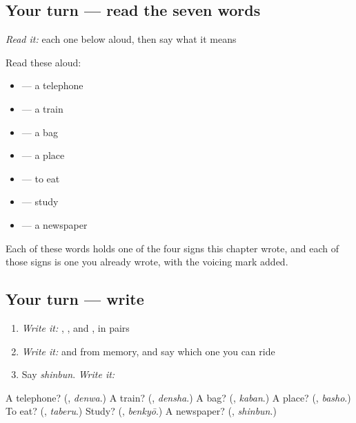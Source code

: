 \subsection*{Your turn — read the seven words}
\emph{Read it:} each one below aloud, then say what it means

Read these aloud:

\begin{itemize}
\raggedright
  \item \textbf{} — a telephone
  \item \textbf{} — a train
  \item \textbf{} — a bag
  \item \textbf{} — a place
  \item \textbf{} — to eat
  \item \textbf{} — study
  \item \textbf{} — a newspaper
\end{itemize}

Each of these words holds one of the four signs this chapter wrote, and each of those signs is one you already wrote, with the voicing mark added.

\subsection*{Your turn — write}
\begin{enumerate}
\raggedright
  \item \emph{Write it:} \textbf{ }, \textbf{ }, \textbf{ } and \textbf{ }, in pairs
  \item \emph{Write it:} \textbf{} and \textbf{} from memory, and say which one you can ride
  \item Say \emph{shinbun}. \emph{Write it:} \textbf{}
\end{enumerate}

\begin{tcolorbox}[breakable,colback=teal!4,colframe=teal!35!black,title={Before you move on}]
A telephone? (\textbf{}, \emph{denwa}.) A train? (\textbf{}, \emph{densha}.) A bag? (\textbf{}, \emph{kaban}.) A place? (\textbf{}, \emph{basho}.) To eat? (\textbf{}, \emph{taberu}.) Study? (\textbf{}, \emph{benkyō}.) A newspaper? (\textbf{}, \emph{shinbun}.)
\end{tcolorbox}
